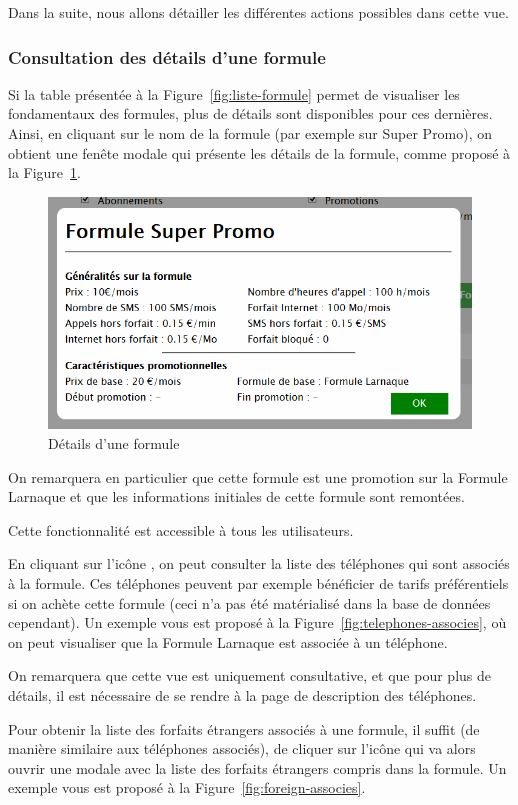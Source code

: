 Dans la suite, nous allons détailler les différentes actions possibles dans cette vue.

\subsubsection{Consultation des détails d'une formule}
Si la table présentée à la Figure~\ref{fig:liste-formule} permet de visualiser les fondamentaux des formules, plus de détails sont disponibles pour ces dernières. Ainsi, en cliquant sur le nom de la formule (par exemple sur \og Super Promo\fg), on obtient une fenête modale qui présente les détails de la formule, comme proposé à la Figure~\ref{fig:details-formule}.

\begin{figure}[ht]
  \centering
  \includegraphics[width=.45\textwidth]{images/Plateforme/detail_formule}
  \caption{Détails d'une formule}
  \label{fig:details-formule}
\end{figure}

On remarquera en particulier que cette formule est une promotion sur la \og Formule Larnaque\fg{} et que les informations initiales de cette formule sont remontées.

Cette fonctionnalité est accessible à tous les utilisateurs.

En cliquant sur l'icône \faMobilePhone{}, on peut consulter la liste des téléphones qui sont associés à la formule. Ces téléphones peuvent par exemple bénéficier de tarifs préférentiels si on achète cette formule (ceci n'a pas été matérialisé dans la base de données cependant). Un exemple vous est proposé à la Figure~\ref{fig:telephones-associes}, où on peut visualiser que la \og Formule Larnaque\fg{} est associée à un téléphone.

On remarquera que cette vue est uniquement consultative, et que pour plus de détails, il est nécessaire de se rendre à la page de description des téléphones.

Pour obtenir la liste des forfaits étrangers associés à une formule, il suffit (de manière similaire aux téléphones associés), de cliquer sur l'icône \faGlobe{} qui va alors ouvrir une modale avec la liste des forfaits étrangers compris dans la formule. Un exemple vous est proposé à la Figure~\ref{fig:foreign-associes}.

